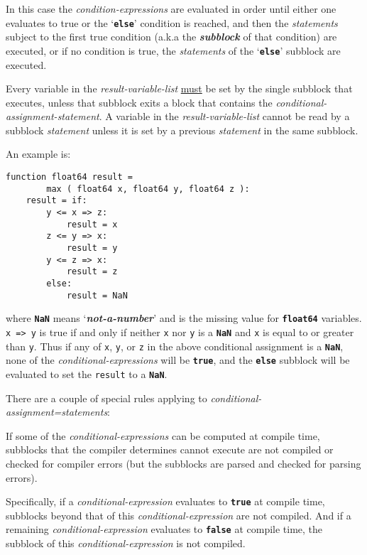 \documentclass[12pt]{article}
\newcommand{\TT}[1]{{\tt \bfseries #1}}
\newcommand{\key}[1]{{\bf \em #1}\index{#1}}
\newenvironment{indpar}[1][0.3in]%
	{\begin{list}{}%
		     {\setlength{\itemsep}{0in}%
		      \setlength{\topsep}{0in}%
		      \setlength{\parsep}{1ex}%
		      \setlength{\labelwidth}{#1}%
		      \setlength{\leftmargin}{#1}%
		      \addtolength{\leftmargin}{\labelsep}}%
	 \item}%
	{\end{list}}
\begin{document}
In this case the {\em condition-expressions} are evaluated in order
until either one evaluates to true or the `\TT{else}' condition is
reached, and then the {\em statements} subject to the
first true condition (a.k.a the \key{subblock} of that condition)
are executed, or if no condition is true, the {\em statements}
of the `\TT{else}' subblock are executed.

Every variable in the {\em result-variable-list} \underline{must} be set by the
single subblock that executes, unless that subblock exits a block
that contains the {\em conditional-assignment-statement}.  A variable in the
{\em result-variable-list} cannot be read by a subblock {\em statement}
unless it is set by a previous {\em statement} in the
same subblock.

An example is:
\begin{indpar}\begin{verbatim}
function float64 result =
        max ( float64 x, float64 y, float64 z ):
    result = if:
        y <= x => z:
            result = x
        z <= y => x:
            result = y
        y <= z => x:
            result = z
        else:
            result = NaN
\end{verbatim}\end{indpar}

where \TT{NaN} means `\key{not-a-number}' and is the missing
value for \TT{float64} variables.  {\tt x~=>~y} is true if
and only if neither {\tt x} nor {\tt y} is a \TT{NaN} and
{\tt x} is equal to or greater than {\tt y}.  Thus if any of
{\tt x}, {\tt y}, or {\tt z} in the above conditional assignment
is a \TT{NaN}, none of the {\em conditional-expressions}
will be \TT{true}, and the \TT{else} subblock will be evaluated to set
the {\tt result} to a \TT{NaN}.

There are a couple of special rules applying to
{\em conditional-assignment=statements}:\label{CONDITIONAL-SPECIAL-RULES}

\begin{indpar}
If some of the {\em conditional-expressions} can be computed at compile
time, subblocks that the compiler determines cannot execute are not
compiled or checked for compiler errors (but the subblocks are parsed
and checked for parsing errors).

Specifically, if a {\em conditional-expression} evaluates to \TT{true}
at compile time, subblocks beyond that of this {\em conditional-expression}
are not compiled.  And if a remaining {\em conditional-expression}
evaluates to \TT{false} at compile time, the subblock of this
{\em conditional-expression} is not compiled.
\end{indpar}
\end{document}
